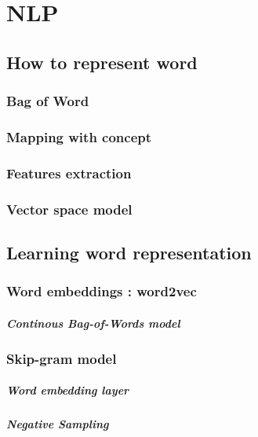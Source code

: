 \chapter{NLP} %
\label{cha:nlp}

	\section{How to represent word}

		\subsection{Bag of Word}

		\subsection{Mapping with concept}

		\subsection{Features extraction}

		\subsection{Vector space model}

	\section{Learning word representation}

		\subsection{Word embeddings : word2vec}
			\paragraph*{Continous Bag-of-Words model}

		\subsection*{Skip-gram model}

			\paragraph{Word embedding layer}

			\paragraph*{Negative Sampling}

